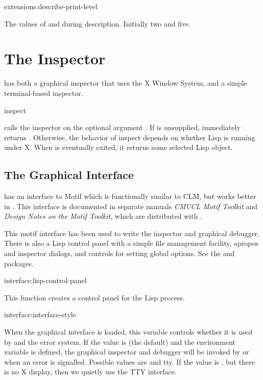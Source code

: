 \begin{defvar}{extensions:}{describe-print-level}
  
  The values of  and  during
  description.  Initially two and five.
\end{defvar}


\section{The Inspector}

\cmucl{} has both a graphical inspector that uses the X Window System,
and a simple terminal-based inspector.

\begin{defun}{}{inspect}{ }
  
   calls the inspector on the optional argument
  .  If  is unsupplied, 
  immediately returns \false.  Otherwise, the behavior of inspect
  depends on whether Lisp is running under X.  When  is
  eventually exited, it returns some selected Lisp object.
\end{defun}


\subsection{The Graphical Interface}
\label{motif-interface}

\cmucl{} has an interface to Motif which is functionally similar to
CLM, but works better in \cmucl{}.  This interface is documented in
separate manuals \textit{CMUCL Motif Toolkit} and \textit{Design Notes
on the Motif Toolkit}, which are distributed with \cmucl{}.

This motif interface has been used to write the inspector and graphical
debugger.  There is also a Lisp control panel with a simple file management
facility, apropos and inspector dialogs, and controls for setting global
options.  See the  and  packages.

\begin{defun}{interface:}{lisp-control-panel}{}
  
  This function creates a control panel for the Lisp process.
\end{defun}

\begin{defvar}{interface:}{interface-style}
  
  When the graphical interface is loaded, this variable controls
  whether it is used by  and the error system.  If the
  value is  (the default) and the 
  environment variable is defined, the graphical inspector and
  debugger will be invoked by  or when an error is
  signalled.  Possible values are  and {tty}.  If the
  value is , but there is no X display, then we quietly
  use the TTY interface.
\end{defvar}


